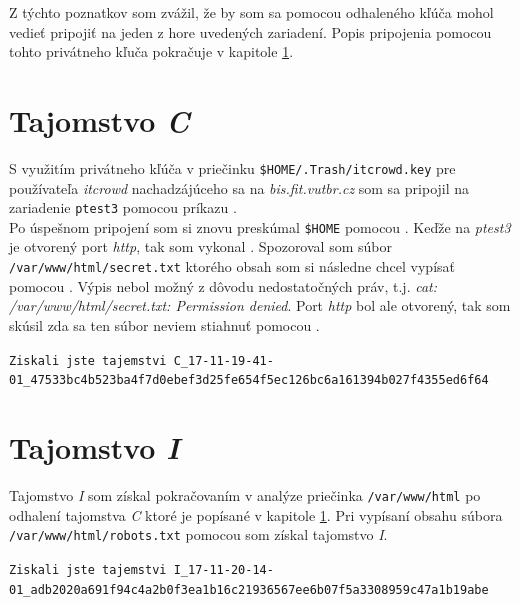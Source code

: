 \documentclass[11pt,a4paper]{article}
\begin{document}
Z týchto poznatkov som zvážil, že by som sa pomocou odhaleného kľúča mohol vedieť pripojiť na jeden z hore uvedených zariadení. Popis pripojenia pomocou tohto privátneho kľuča pokračuje v kapitole \ref{sec:C}.

\section{Tajomstvo \textit{C}}\label{sec:C}

S využitím privátneho kľúča v priečinku \texttt{\$HOME/.Trash/itcrowd.key} pre používateľa \textit{itcrowd} nachadzájúceho sa na \textit{bis.fit.vutbr.cz} som sa pripojil na zariadenie \texttt{ptest3} pomocou príkazu .\\

Po úspešnom pripojení som si znovu preskúmal \texttt{\$HOME} pomocou . Keďže na \textit{ptest3} je otvorený port \textit{http}, tak som vykonal . Spozoroval som súbor \texttt{/var/www/html/secret.txt} ktorého obsah som si následne chcel vypísať pomocou . Výpis nebol možný z dôvodu nedostatočných práv, t.j. \textit{cat: /var/www/html/secret.txt: Permission denied}. Port \textit{http} bol ale otvorený, tak som skúsil zda sa ten súbor neviem stiahnuť pomocou .

\begin{center}
\small{\texttt{Ziskali jste tajemstvi C\_17-11-19-41-01\_47533bc4b523ba4f7d0ebef3d25fe654f5ec126bc6a161394b027f4355ed6f64}}
\end{center}

\section{Tajomstvo \textit{I}}\label{sec:I}

Tajomstvo \textit{I} som získal pokračovaním v analýze priečinka \texttt{/var/www/html} po odhalení tajomstva \textit{C} ktoré je popísané v kapitole \ref{sec:C}. Pri vypísaní obsahu súbora \texttt{/var/www/html/robots.txt} pomocou  som získal tajomstvo \textit{I}.

\begin{center}
\small{\texttt{Ziskali jste tajemstvi I\_17-11-20-14-01\_adb2020a691f94c4a2b0f3ea1b16c21936567ee6b07f5a3308959c47a1b19abe}}
\end{center}
\end{document}

